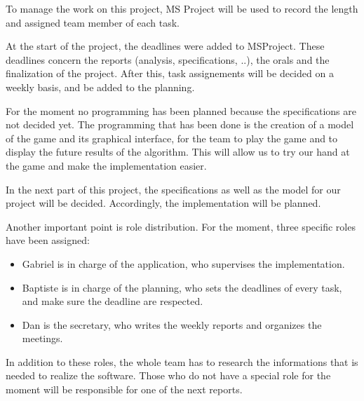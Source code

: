 \label{last last part}
To manage the work on this project, MS Project will be used to record the length and assigned team member of each task.
\newline

At the start of the project, the deadlines were added to MSProject. These deadlines concern the reports (analysis, specifications, ..), the orals and the finalization of the project. After this, task assignements will be decided on a weekly basis, and be added to the planning.
\newline

For the moment no programming has been planned because the specifications are not decided yet. The programming that has been done is the creation of a model of the game and its graphical interface, for the team to play the game and to display the future results of the algorithm. This will allow us to try our hand at the game and make the implementation easier.
\newline

In the next part of this project, the specifications as well as the model for our project will be decided. Accordingly, the implementation will be planned.
\newline

Another important point is role distribution. For the moment, three specific roles have been assigned: 
\begin{itemize}
\item Gabriel is in charge of the application, who supervises the implementation.
\item Baptiste is in charge of the planning, who sets the deadlines of every task, and make sure the deadline are respected.
\item Dan is the secretary, who writes the weekly reports and organizes the meetings.
\end{itemize}

In addition to these roles, the whole team has to research the informations that is needed to realize the software. Those who do not have a special role for the moment will be responsible for one of the next reports.